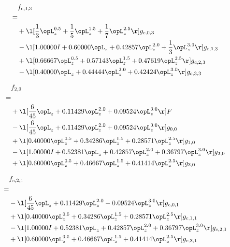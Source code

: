 \begin{alignat}{2} 
\label{eq:f_13_0} 
& f_{c,1,3} \nonumber \\ 
 = \\ 
& + \l[ \frac{1}{3} \opL_z^{0.5} + \frac{1}{5} \opL_z^{1.5} + \frac{1}{7} \opL_z^{2.5}  \r] g_{c,0,3} \nonumber \\ 
& - \l[  1.00000 I +  0.60000 \opL_z +  0.42857 \opL_z^{2.0} + \frac{1}{3} \opL_z^{3.0}  \r] g_{c,1,3} \nonumber \\ 
& + \l[  0.66667 \opL_z^{0.5} +  0.57143 \opL_z^{1.5} +  0.47619 \opL_z^{2.5}  \r] g_{c,2,3} \nonumber \\ 
& - \l[  0.40000 \opL_z +  0.44444 \opL_z^{2.0} +  0.42424 \opL_z^{3.0}  \r] g_{c,3,3} \nonumber \\ 
\end{alignat} 


\begin{alignat}{2} 
\label{eq:f_20_0} 
& f_{2,0} \nonumber \\ 
 = \\ 
& + \l[ \frac{6}{45} \opL_z +  0.11429 \opL_z^{2.0} +  0.09524 \opL_z^{3.0}  \r] F \nonumber \\ 
& - \l[ \frac{6}{45} \opL_z +  0.11429 \opL_z^{2.0} +  0.09524 \opL_z^{3.0}  \r] g_{0,0} \nonumber \\ 
& + \l[  0.40000 \opL_z^{0.5} +  0.34286 \opL_z^{1.5} +  0.28571 \opL_z^{2.5}  \r] g_{1,0} \nonumber \\ 
& - \l[  1.00000 I +  0.52381 \opL_z +  0.42857 \opL_z^{2.0} +  0.36797 \opL_z^{3.0}  \r] g_{2,0} \nonumber \\ 
& + \l[  0.60000 \opL_z^{0.5} +  0.46667 \opL_z^{1.5} +  0.41414 \opL_z^{2.5}  \r] g_{3,0} \nonumber \\ 
\end{alignat} 


\begin{alignat}{2} 
\label{eq:f_21_0} 
& f_{c,2,1} \nonumber \\ 
 = \\ 
& - \l[ \frac{6}{45} \opL_z +  0.11429 \opL_z^{2.0} +  0.09524 \opL_z^{3.0}  \r] g_{c,0,1} \nonumber \\ 
& + \l[  0.40000 \opL_z^{0.5} +  0.34286 \opL_z^{1.5} +  0.28571 \opL_z^{2.5}  \r] g_{c,1,1} \nonumber \\ 
& - \l[  1.00000 I +  0.52381 \opL_z +  0.42857 \opL_z^{2.0} +  0.36797 \opL_z^{3.0}  \r] g_{c,2,1} \nonumber \\ 
& + \l[  0.60000 \opL_z^{0.5} +  0.46667 \opL_z^{1.5} +  0.41414 \opL_z^{2.5}  \r] g_{c,3,1} \nonumber \\ 
\end{alignat} 


